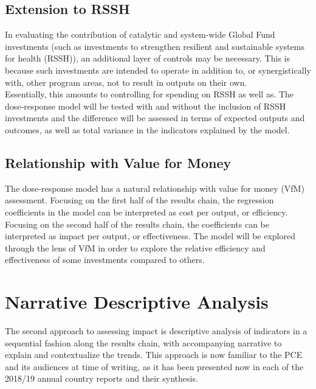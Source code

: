 \documentclass[twocolumn]{bmcart}%
\begin{document}
\subsection{Extension to RSSH}
In evaluating the contribution of catalytic and system-wide Global Fund investments (such as investments to strengthen resilient and sustainable systems for health (RSSH)), an additional layer of controls may be necessary. This is because such investments are intended to operate in addition to, or synergistically with, other program areas, not to result in outputs on their own. \\

Essentially, this amounts to controlling for spending on RSSH as well as. The dose-response model will be tested with and without the inclusion of RSSH investments and the difference will be assessed in terms of expected outputs and outcomes, as well as total variance in the indicators explained by the model. \\

\subsection{Relationship with Value for Money} \label{vfm}
The dose-response model has a natural relationship with value for money (VfM) assessment. Focusing on the first half of the results chain, the regression coefficients in the model can be interpreted as cost per output, or efficiency. Focusing on the second half of the results chain, the coefficients can be interpreted as impact per output, or effectiveness. The model will be explored through the lens of VfM in order to explore the relative efficiency and effectiveness of some investments compared to others. \\

\section{Narrative Descriptive Analysis}
The second approach to assessing impact is descriptive analysis of indicators in a sequential fashion along the results chain, with accompanying narrative to explain and contextualize the trends. This approach is now familiar to the PCE and its audiences at time of writing, as it has been presented now in each of the 2018/19 annual country reports and their synthesis. \\
\end{document}
